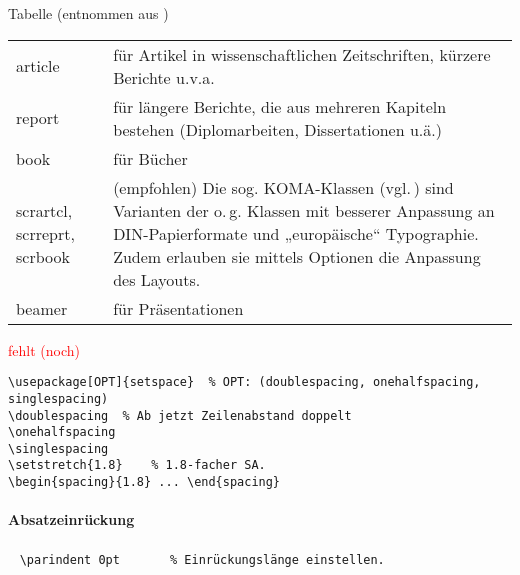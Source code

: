 \bigskip\bigskip

\noindent\begin{minipage}{\linewidth}
Tabelle (entnommen aus \cite[S.\,8\,f]{l2kurz})

\begin{tabular}{L{9ex}L{28ex}}
\toprule
	article	
	& für Artikel in wissenschaftlichen Zeitschriften, kürzere 	Berichte u.v.a.
\\
	report
	&für längere Berichte, die aus mehreren Kapiteln bestehen (Diplomarbeiten, Dissertationen u.ä.)
\\
	book
	&für Bücher
\\
	scrartcl, scrreprt, scrbook
	& {\gray(empfohlen)} Die sog. KOMA-Klassen (vgl.\,\cite{scrguide}) sind Varianten der o.\,g. Klassen mit besserer Anpassung an DIN-Papierformate und „europäische“ Typographie.
	Zudem erlauben sie mittels Optionen die Anpassung des Layouts.
\\
	beamer
	& für Präsentationen
\\ \bottomrule
\end{tabular}
\end{minipage}

\label{cha:Schriftarten}
\textcolor{red}{fehlt (noch)}
\notizenplatz\notizenplatz


\negAbstand

\begin{lstlisting}
\usepackage[OPT]{setspace}	% OPT: (doublespacing, onehalfspacing, singlespacing)
\doublespacing	% Ab jetzt Zeilenabstand doppelt
\onehalfspacing	
\singlespacing	
\setstretch{1.8}	% 1.8-facher SA.
\begin{spacing}{1.8} ... \end{spacing}
\end{lstlisting}

\label{cha:Absatz}
%
\paragraph*{Absatzeinrückung} ~\linebreak
\lstinline|\parindent 0pt		% Einrückungslänge einstellen.|
	{\footnotesize{}}%
%
